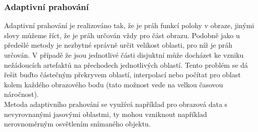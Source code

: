 \documentclass{thesis}%
\begin{document}
 \subsubsection{Adaptivní prahování}
 Adaptivní prahování je realizováno tak, že je práh funkcí polohy v obraze, jinými slovy můžeme říct, že je práh určován vždy pro část obrazu. Podobně jako u předešlé metody je nezbytné správně určit velikost oblasti, pro níž je práh určován. V případě že jsou jednotlivé části disjuktní může docházet ke vzniku nežádoucích artefaktů na přechodech jednotlivých oblastí. Tento problém se dá řešit buďto částečným překryvem oblastí, interpolací nebo počítat pro oblast kolem každého obrazového bodu (tato možnost vede na velkou časovou náročnost).\\
 Metoda adaptivního prahování se využívá například pro obrazová data s nevyrovnanými jasovými oblastmi, ty mohou vzniknout například nerovnoměrným osvětlením snímaného objektu.
\end{document}
